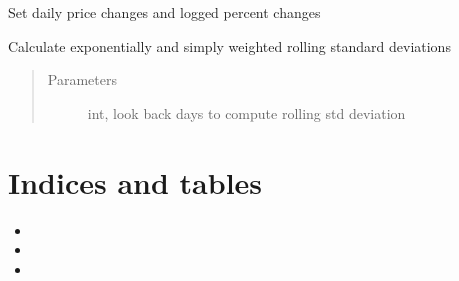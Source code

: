 \documentclass[letterpaper,10pt,english]{sphinxmanual}
\begin{document}
\begin{fulllineitems}
\begin{fulllineitems}
\begin{quote}
\begin{description}
\end{description}\end{quote}

\end{fulllineitems}


\begin{fulllineitems}
\label{\detokenize{market_data:risk_dash.market_data.QuandlStockData.set_price_changes}}
Set daily price changes and logged percent changes

\end{fulllineitems}


\begin{fulllineitems}
\label{\detokenize{market_data:risk_dash.market_data.QuandlStockData.set_volatility}}
Calculate exponentially and simply weighted rolling standard deviations
\begin{quote}\begin{description}
\item[{Parameters}] \leavevmode
{} \textendash{} int, look back days to compute rolling std deviation

\end{description}\end{quote}

\end{fulllineitems}


\end{fulllineitems}



\chapter{Indices and tables}
\label{\detokenize{index:indices-and-tables}}\begin{itemize}
\item {} 

\item {} 

\item {} 

\end{itemize}
\end{document}
